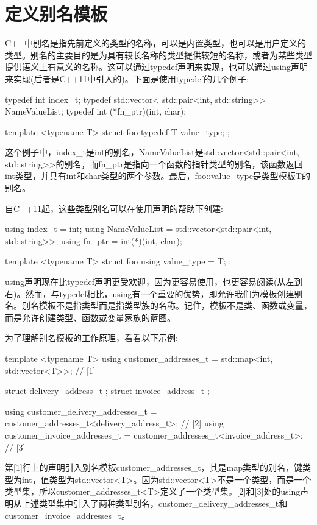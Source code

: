 \section{定义别名模板}
C++中别名是指先前定义的类型的名称，可以是内置类型，也可以是用户定义的类型。别名的主要目的是为具有较长名称的类型提供较短的名称，或者为某些类型提供语义上有意义的名称。这可以通过typedef声明来实现，也可以通过using声明来实现(后者是C++11中引入的)。下面是使用typedef的几个例子:

\begin{cpp}
typedef int index_t;
typedef std::vector<
			std::pair<int, std::string>> NameValueList;
typedef int (*fn_ptr)(int, char);

template <typename T>
struct foo
{
	typedef T value_type;
};
\end{cpp}

这个例子中，index\_t是int的别名，NameValueList是std::vector<std::pair<int, std::string>{}>的别名，而fn\_ptr是指向一个函数的指针类型的别名，该函数返回int类型，并具有int和char类型的两个参数。最后，foo::value\_type是类型模板T的别名。

自C++11起，这些类型别名可以在使用声明的帮助下创建:

\begin{cpp}
using index_t = int;
using NameValueList =
	std::vector<std::pair<int, std::string>>;
using fn_ptr = int(*)(int, char);

template <typename T>
struct foo
{
	using value_type = T;
};
\end{cpp}

using声明现在比typedef声明更受欢迎，因为更容易使用，也更容易阅读(从左到右)。然而，与typedef相比，using有一个重要的优势，即允许我们为模板创建别名。别名模板不是指类型而是指类型族的名称。记住，模板不是类、函数或变量，而是允许创建类型、函数或变量家族的蓝图。

为了理解别名模板的工作原理，看看以下示例:

\begin{cpp}
template <typename T>
using customer_addresses_t =
	std::map<int, std::vector<T>>; // [1]
	
struct delivery_address_t {};
struct invoice_address_t {};

using customer_delivery_addresses_t =
	customer_addresses_t<delivery_address_t>; // [2]
using customer_invoice_addresses_t =
	customer_addresses_t<invoice_address_t>; // [3]
\end{cpp}

第[1]行上的声明引入别名模板customer\_addresses\_t，其是map类型的别名，键类型为int，值类型为std::vector<T>。因为std::vector<T>不是一个类型，而是一个类型集，所以customer\_addresses\_t<T>定义了一个类型集。[2]和[3]处的using声明从上述类型集中引入了两种类型别名，customer\_delivery\_addresses\_t和customer\_invoice\_addresses\_t。

